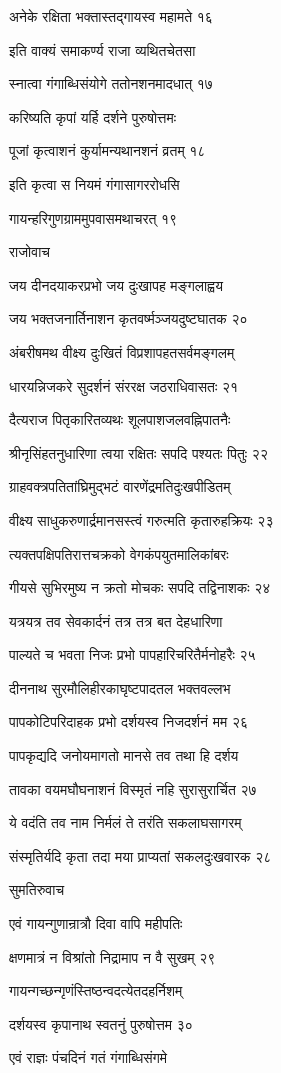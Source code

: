 अनेके रक्षिता भक्तास्तद्गायस्व महामते १६

इति वाक्यं समाकर्ण्य राजा व्यथितचेतसा

स्नात्वा गंगाब्धिसंयोगे ततोनशनमादधात् १७

करिष्यति कृपां यर्हि दर्शने पुरुषोत्तमः

पूजां कृत्वाशनं कुर्यामन्यथानशनं व्रतम् १८

इति कृत्वा स नियमं गंगासागररोधसि

गायन्हरिगुणग्राममुपवासमथाचरत् १९

राजोवाच

जय दीनदयाकरप्रभो जय दुःखापह मङ्गलाह्वय

जय भक्तजनार्तिनाशन कृतवर्ष्मञ्जयदुष्टघातक २०

अंबरीषमथ वीक्ष्य दुःखितं विप्रशापहतसर्वमङ्गलम्

धारयन्निजकरे सुदर्शनं संररक्ष जठराधिवासतः २१

दैत्यराज पितृकारितव्यथः शूलपाशजलवह्निपातनैः

श्रीनृसिंहतनुधारिणा त्वया रक्षितः सपदि पश्यतः पितुः २२

ग्राहवक्त्रपतितांघ्रिमुद्भटं वारणेंद्रमतिदुःखपीडितम्

वीक्ष्य साधुकरुणार्द्रमानसस्त्वं गरुत्मति कृतारुहक्रियः २३

त्यक्तपक्षिपतिरात्तचक्रको वेगकंपयुतमालिकांबरः

गीयसे सुभिरमुष्य न क्रतो मोचकः सपदि तद्विनाशकः २४

यत्रयत्र तव सेवकार्दनं तत्र तत्र बत देहधारिणा

पाल्यते च भवता निजः प्रभो पापहारिचरितैर्मनोहरैः २५

दीननाथ सुरमौलिहीरकाघृष्टपादतल भक्तवल्लभ

पापकोटिपरिदाहक प्रभो दर्शयस्व निजदर्शनं मम २६

पापकृद्यदि जनोयमागतो मानसे तव तथा हि दर्शय

तावका वयमघौघनाशनं विस्मृतं नहि सुरासुरार्चित २७

ये वदंति तव नाम निर्मलं ते तरंति सकलाघसागरम्

संस्मृतिर्यदि कृता तदा मया प्राप्यतां सकलदुःखवारक २८

सुमतिरुवाच

एवं गायन्गुणान्रात्रौ दिवा वापि महीपतिः

क्षणमात्रं न विश्रांतो निद्रामाप न वै सुखम् २९

गायन्गच्छन्गृणंस्तिष्ठन्वदत्येतदहर्निशम्

दर्शयस्व कृपानाथ स्वतनुं पुरुषोत्तम ३०

एवं राज्ञः पंचदिनं गतं गंगाब्धिसंगमे

